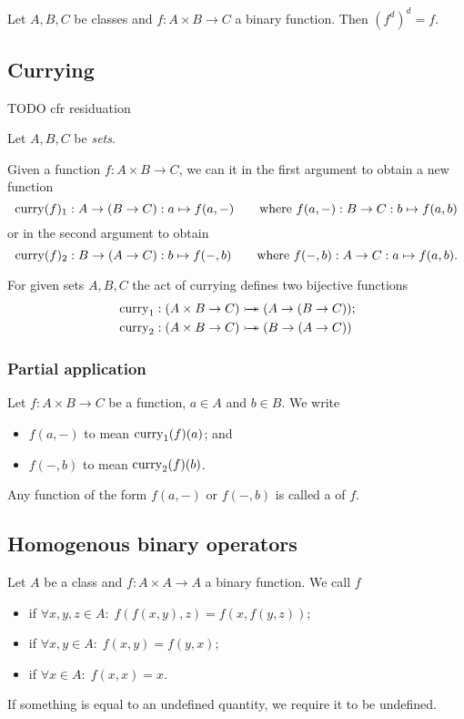 \begin{lemma}
Let $A, B, C$ be classes and $f: A\times B \to C$ a binary function. Then $(f^d)^d = f$.
\end{lemma}

\subsection{Currying}
TODO cfr residuation

\begin{definition}
Let $A,B,C$ be \emph{sets}.

Given a function $f: A\times B \to C$, we can  it in the first argument to obtain a new function
\[ \operatorname{curry}(f)_1: A \to (B\to C): a\mapsto f(a,-) \qquad \text{where $f(a,-): B \to C: b\mapsto f(a,b)$} \]
or in the second argument to obtain
\[ \operatorname{curry}(f)_2: B \to (A\to C): b\mapsto f(-,b) \qquad \text{where $f(-,b): A \to C: a\mapsto f(a,b)$}. \]
\end{definition}
\begin{lemma}
For given sets $A,B,C$ the act of currying defines two bijective functions
\begin{align*}
&\operatorname{curry}_1: (A\times B \to C) \mathrel{\rightarrowtail\kern-1.9ex\twoheadrightarrow} (A \to (B\to C)); \\
&\operatorname{curry}_2: (A\times B \to C) \mathrel{\rightarrowtail\kern-1.9ex\twoheadrightarrow} (B \to (A\to C))
\end{align*}
\end{lemma}

\subsubsection{Partial application}
\begin{definition}
Let $f: A\times B \to C$ be a function, $a\in A$ and $b\in B$. We write
\begin{itemize}
\item $f(a, -)$ to mean $\operatorname{curry}_1(f)(a)$; and
\item $f(-, b)$ to mean $\operatorname{curry}_2(f)(b)$.
\end{itemize}
Any function of the form $f(a, -)$ or $f(-,b)$ is called a  of $f$.
\end{definition}

\subsection{Homogenous binary operators}
\begin{definition}
Let $A$ be a class and $f: A\times A \to A$ a binary function. We call $f$
\begin{itemize}
\item {} if $\forall x,y, z\in A: \; f(f(x,y),z) = f(x,f(y,z))$;
\item {} if $\forall x,y\in A: \; f(x,y) = f(y,x)$;
\item {} if $\forall x\in A:\; f(x,x) = x$.
\end{itemize}
If something is equal to an undefined quantity, we require it to be undefined.
\end{definition}

